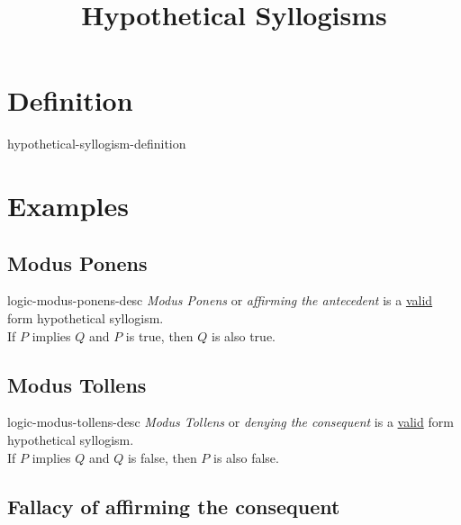 \documentclass[preview]{standalone}
\begin{document}
\title{Hypothetical Syllogisms}
\genpage

\section{Definition}

\begin{snippet}{hypothetical-syllogism-definition}
\end{snippet}


\section{Examples}

\subsection{Modus Ponens}

\begin{snippet}{logic-modus-ponens-desc}
\textit{Modus Ponens} or \textit{affirming the antecedent}
is a \underline{valid} form hypothetical syllogism. \\
If \(P\) implies \(Q\) and \(P\) is true, then \(Q\) is also true.
\end{snippet}


\subsection{Modus Tollens}

\begin{snippet}{logic-modus-tollens-desc}
\textit{Modus Tollens} or \textit{denying the consequent}
is a \underline{valid} form hypothetical syllogism. \\
If \(P\) implies \(Q\) and \(Q\) is false, then \(P\) is also false.
\end{snippet}


\subsection{Fallacy of affirming the consequent}
\end{document}
